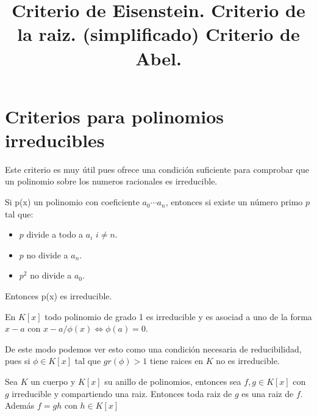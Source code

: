 \documentclass{article}
\begin{document}

\section{Criterios para polinomios irreducibles}

\title{ Criterio de Eisenstein. }

Este criterio es muy útil pues ofrece una condición suficiente para comprobar que un polinomio sobre los numeros racionales es irreducible.

Si p(x) un polinomio con coeficiente $a_0\cdots a_n$, entonces si existe un número primo $p$ tal que:
\begin{itemize}
     \item $p$ divide a todo a $a_i$ $i \neq n$.
     \item $p$ no divide a $a_n$.
     \item $p^2$ no divide a $a_0$.
\end{itemize}

Entonces p(x) es irreducible.


\title{ Criterio de la raiz. (simplificado)}
En $K[x]$ todo polinomio de grado 1 es irreducible y es asociad a uno de la forma $x-a$ con $x-a/\phi(x) \iff \phi(a)=0$.

De este modo podemos ver esto como una condición necesaria de reducibilidad, pues si $\phi\in K[x]$ tal que $gr(\phi)>1$ tiene raices en $K$ no es irreducible.


\title{ Criterio de Abel. }
Sea $K$ un cuerpo y $K[x]$ su anillo de polinomios, entonces sea $f,g \in K[x]$ con $g$ irreducible y compartiendo una raiz. Entonces toda raiz de $g$ es una raiz de $f$. Además $f = gh$ con $h \in K[x]$
\end{document}
